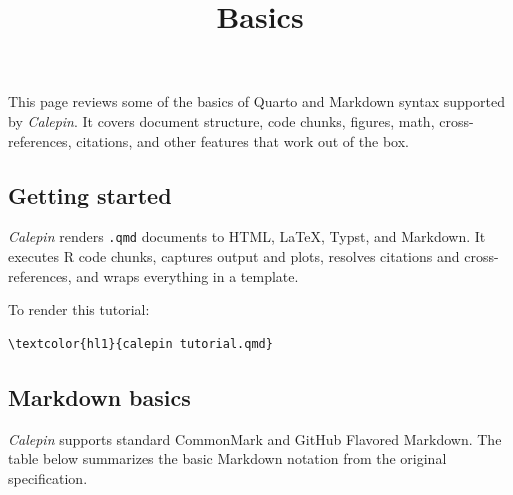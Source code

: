 \documentclass[11pt]{article}
\title{Basics}
\begin{document}
\maketitle
\ifdefined\affiliationblock\affiliationblock\fi





This page reviews some of the basics of Quarto and Markdown syntax supported by \emph{Calepin}. It covers document structure, code chunks, figures, math, cross-references, citations, and other features that work out of the box.

\subsection*{Getting started}
\label{getting-started}

\emph{Calepin} renders \texttt{.qmd} documents to HTML, LaTeX, Typst, and Markdown. It executes R code chunks, captures output and plots, resolves citations and cross-references, and wraps everything in a template.

To render this tutorial:




\begin{srccode}
\begin{Verbatim}[commandchars=\\\{\}]
\textcolor{hl1}{calepin tutorial.qmd}
\end{Verbatim}
\end{srccode}

\subsection*{Markdown basics}
\label{markdown-basics}

\emph{Calepin} supports standard CommonMark and GitHub Flavored Markdown. The table below summarizes the basic Markdown notation from the original specification.
\end{document}

